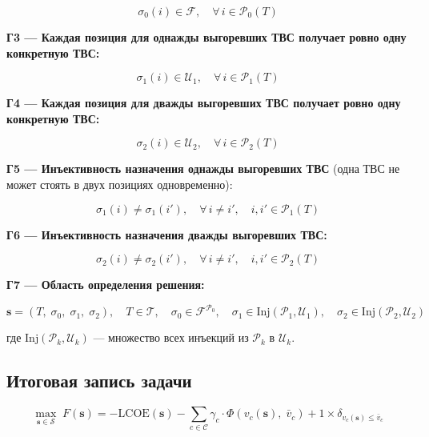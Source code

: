 \documentclass[12pt,a4paper]{article}
\begin{document}
\begin{equation}
\sigma_0(i) \in \mathcal{F}, \quad \forall\, i \in \mathcal{P}_0(T)
\end{equation}

\textbf{Г3 --- Каждая позиция для однажды выгоревших ТВС получает ровно одну конкретную ТВС:}

\begin{equation}
\sigma_1(i) \in \mathcal{U}_1, \quad \forall\, i \in \mathcal{P}_1(T)
\end{equation}

\textbf{Г4 --- Каждая позиция для дважды выгоревших ТВС получает ровно одну конкретную ТВС:}

\begin{equation}
\sigma_2(i) \in \mathcal{U}_2, \quad \forall\, i \in \mathcal{P}_2(T)
\end{equation}

\textbf{Г5 --- Инъективность назначения однажды выгоревших ТВС} (одна ТВС не может стоять в двух позициях одновременно):

\begin{equation}
\sigma_1(i) \neq \sigma_1(i'), \quad \forall\, i \neq i',\quad i, i' \in \mathcal{P}_1(T)
\end{equation}

\textbf{Г6 --- Инъективность назначения дважды выгоревших ТВС:}

\begin{equation}
\sigma_2(i) \neq \sigma_2(i'), \quad \forall\, i \neq i',\quad i, i' \in \mathcal{P}_2(T)
\end{equation}

\textbf{Г7 --- Область определения решения:}

\begin{equation}
\mathbf{s} = (T,\; \sigma_0,\; \sigma_1,\; \sigma_2), \quad T \in \mathcal{T},\quad \sigma_0 \in \mathcal{F}^{\mathcal{P}_0},\quad \sigma_1 \in \mathrm{Inj}(\mathcal{P}_1, \mathcal{U}_1),\quad \sigma_2 \in \mathrm{Inj}(\mathcal{P}_2, \mathcal{U}_2)
\end{equation}

где $\mathrm{Inj}(\mathcal{P}_k, \mathcal{U}_k)$ --- множество всех инъекций из $\mathcal{P}_k$ в $\mathcal{U}_k$.

\subsection*{Итоговая запись задачи}

\begin{equation}
\max_{\mathbf{s} \in \mathcal{S}}\; F(\mathbf{s}) = -\mathrm{LCOE}(\mathbf{s}) - \sum_{c \in \mathcal{C}} \gamma_c \cdot \Phi\left(v_c(\mathbf{s}),\; \bar{v}_c\right) + 1 \times \delta_{v_c(\mathbf{s}) \leq \bar{v}_c}
\end{equation}
\end{document}
